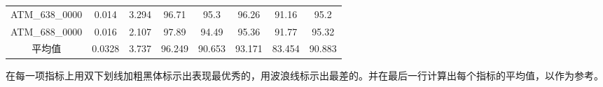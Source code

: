 \begin{table}[ht]
\begin{tabular}{cccccccc}
        ATM\_638\_0000 & 0.014          & 3.294          & 96.71          & 95.3           & 96.26          & 91.16          & 95.2           \\
        ATM\_688\_0000 & 0.016          & 2.107          & 97.89          & 94.49          & 95.36          & 91.77          & 95.32          \\
        \midrule
        平均值          & 0.0328         & 3.737          & 96.249         & 90.653         & 93.171         & 83.454         & 90.883         \\
        \bottomrule
    \end{tabular}
\end{table}
在每一项指标上用双下划线加粗黑体标示出表现最优秀的，用波浪线标示出最差的。并在最后一行计算出每个指标的平均值，以作为参考。

